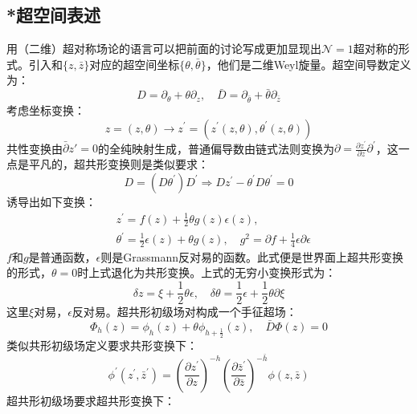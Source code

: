 \subsection{*超空间表述}
用（二维）超对称场论的语言可以把前面的讨论写成更加显现出$\mathcal{N}=1$超对称的形式。引入和$\{z,\bar z\}$对应的超空间坐标$\{\theta,\bar\theta\}$，他们是二维Weyl旋量。超空间导数定义为：
\begin{equation}
	D=\partial_\theta+\theta\partial_z,\quad\bar{D}=\partial_{\bar{\theta}}+\bar{\theta}\partial_{\bar{z}}
\end{equation}
考虑坐标变换：
\begin{equation}
	z=(z,\theta)\to z^{\prime}=(z^{\prime}(z,\theta),\theta^{\prime}(z,\theta))
\end{equation}
共性变换由$\bar \partial z' = 0$的全纯映射生成，普通偏导数由链式法则变换为$\partial=\frac{\partial z^{\prime}}{\partial z}\partial^{\prime}$，这一点是平凡的，超共形变换则是类似要求：
\begin{equation}
	D=(D\theta^{\prime})D^{\prime}\Rightarrow Dz^{\prime}-\theta^{\prime}D\theta^{\prime}=0
\end{equation}
诱导出如下变换：
\begin{equation}
	\begin{aligned}&z^{\prime}=f(z)+\frac{1}{2}\theta g(z)\epsilon(z),\\&\theta^{\prime}=\frac{1}{2}\epsilon(z)+\theta g(z),\quad g^{2}=\partial f+\frac{1}{4}\epsilon\partial\epsilon\end{aligned}
\end{equation}
$f$和$g$是普通函数，$\epsilon$则是Grassmann反对易的函数。此式便是世界面上超共形变换的形式，$\theta = 0$时上式退化为共形变换。上式的无穷小变换形式为：
\begin{equation}
	\label{inf}
	\delta z=\xi+\frac{1}{2}\theta\epsilon,\quad\delta\theta=\frac{1}{2}\epsilon+\frac{1}{2}\theta\partial\xi
\end{equation}
这里$\xi$对易，$\epsilon$反对易。超共形初级场对构成一个手征超场：
\begin{equation}
	\Phi_h(z)=\phi_h(z)+\theta\phi_{h+\frac12}(z),\quad \bar D\Phi(z) = 0
\end{equation}
类似共形初级场定义要求共形变换下：
\begin{equation}
	\phi^{\prime}(z^{\prime},\bar{z}^{\prime})=\left(\frac{\partial z^{\prime}}{\partial z}\right)^{-h}\left(\frac{\partial\bar{z}^{\prime}}{\partial\bar{z}}\right)^{-\bar{h}}\phi(z,\bar{z})
\end{equation}
超共形初级场要求超共形变换下：
